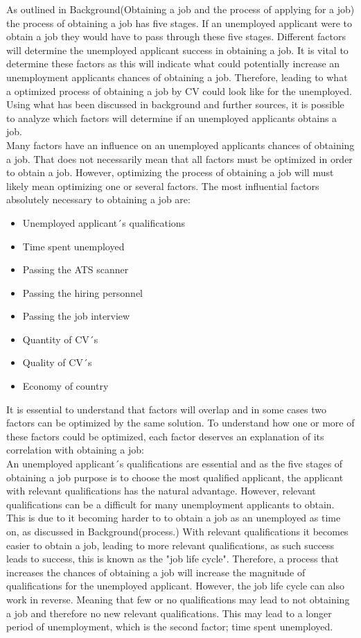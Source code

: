 As outlined in Background(Obtaining a job and the process of applying for a job) the process of obtaining a job has five stages.
If an unemployed applicant were to obtain a job they would have to pass through these five stages.
Different factors will determine the unemployed applicant success in obtaining a job.
It is vital to determine these factors as this will indicate what could potentially increase an unemployment applicants chances of obtaining a job.
Therefore, leading to what a optimized process of obtaining a job by CV could look like for the unemployed.
Using what has been discussed in background and further sources, it is possible to analyze which factors will determine if an unemployed applicants obtains a job. \\

Many factors have an influence on an unemployed applicants chances of obtaining a job.
That does not necessarily mean that all factors must be optimized in order to obtain a job.
However, optimizing the process of obtaining a job will must likely mean optimizing one or several factors.
The most influential factors absolutely necessary to obtaining a job are: \\
\begin{itemize}
  \item  Unemployed applicant´s qualifications
  \item  Time spent unemployed
  \item  Passing the ATS scanner
  \item  Passing the hiring personnel
  \item  Passing the job interview
  \item  Quantity of CV´s 
  \item  Quality of CV´s
  \item  Economy of country
\end{itemize} 
It is essential to understand that factors will overlap and in some cases two factors can be optimized by the same solution.
To understand how one or more of these factors could be optimized, each factor deserves an explanation of its correlation with obtaining a job: \\

An unemployed applicant´s qualifications are essential and as the five stages of obtaining a job purpose is to choose the most qualified applicant, the applicant with relevant qualifications has the natural advantage.
However, relevant qualifications can be a difficult for many unemployment applicants to obtain.
This is due to it becoming harder to to obtain a job as an unemployed as time on, as discussed in Background(process.)
With relevant qualifications it becomes easier to obtain a job, leading to more relevant qualifications, as such success leads to success, this is known as the "job life cycle".\cite{Job_Cycle}
Therefore, a process that increases the chances of obtaining a job will increase the magnitude of qualifications for the unemployed applicant.
However, the job life cycle can also work in reverse.
Meaning that few or no qualifications may lead to not obtaining a job and therefore no new relevant qualifications.
This may lead to a longer period of unemployment, which is the second factor; time spent unemployed. \\

